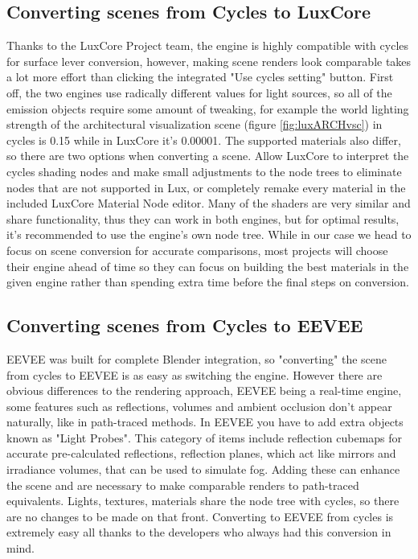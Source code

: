 \documentclass[conference]{IEEEtran}
\begin{document}
\subsection{Converting scenes from Cycles to LuxCore}
    Thanks to the LuxCore Project team, the engine is highly compatible with cycles for surface lever conversion, however, making scene renders look comparable takes a lot more effort than clicking the integrated "Use cycles setting" button. First off, the two engines use radically different values for light sources, so all of the emission objects require some amount of tweaking, for example the world lighting strength of the architectural visualization scene (figure \ref{fig:luxARCHvsc}) in cycles is 0.15 while in LuxCore it's 0.00001. The supported materials also differ, so there are two options when converting a scene. Allow LuxCore to interpret the cycles shading nodes and make small adjustments to the node trees to eliminate nodes that are not supported in Lux, or completely remake every material in the included LuxCore Material Node editor. Many of the shaders are very similar and share functionality, thus they can work in both engines, but for optimal results, it's recommended to use the engine's own node tree. While in our case we head to focus on scene conversion for accurate comparisons, most projects will choose their engine ahead of time so they can focus on building the best materials in the given engine rather than spending extra time before the final steps on conversion.
    
\subsection{Converting scenes from Cycles to EEVEE}
    EEVEE was built for complete Blender integration, so "converting" the scene from cycles to EEVEE is as easy as switching the engine. However there are obvious differences to the rendering approach, EEVEE being a real-time engine, some features such as reflections, volumes and ambient occlusion don't appear naturally, like in path-traced methods. In EEVEE you have to add extra objects known as "Light Probes". This category of items include reflection cubemaps for accurate pre-calculated reflections, reflection planes, which act like mirrors and irradiance volumes, that can be used to simulate fog. Adding these can enhance the scene and are necessary to make comparable renders to path-traced equivalents. Lights, textures, materials share the node tree with cycles, so there are no changes to be made on that front. Converting to EEVEE from cycles is extremely easy all thanks to the developers who always had this conversion in mind.
\end{document}
